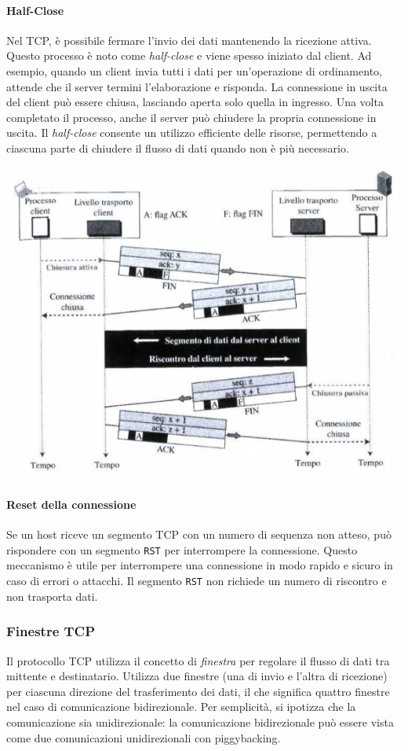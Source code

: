 \documentclass[12pt]{report}
\begin{document}
	\paragraph{Half-Close}
	Nel TCP, è possibile fermare l'invio dei dati mantenendo la ricezione attiva. Questo processo è noto come \textit{half-close} e viene spesso iniziato dal client. Ad esempio, quando un client invia tutti i dati per un'operazione di ordinamento, attende che il server termini l'elaborazione e risponda. La connessione in uscita del client può essere chiusa, lasciando aperta solo quella in ingresso. Una volta completato il processo, anche il server può chiudere la propria connessione in uscita.
	Il \textit{half-close} consente un utilizzo efficiente delle risorse, permettendo a ciascuna parte di chiudere il flusso di dati quando non è più necessario.
	\begin{center}
		\includegraphics[scale=0.6]{assets/halfclose.png}
	\end{center}

	\paragraph{Reset della connessione}
	Se un host riceve un segmento TCP con un numero di sequenza non atteso, può rispondere con un segmento \texttt{RST} per interrompere la connessione. Questo meccanismo è utile per interrompere una connessione in modo rapido e sicuro in caso di errori o attacchi. Il segmento \texttt{RST} non richiede un numero di riscontro e non trasporta dati.

	\subsubsection{Finestre TCP}
	Il protocollo TCP utilizza il concetto di \textit{finestra} per regolare il flusso di dati tra mittente e destinatario. Utilizza due finestre (una di invio e l'altra di ricezione) per ciascuna direzione del trasferimento dei dati, il che significa quattro finestre nel caso di comunicazione bidirezionale. Per semplicità, si ipotizza che la comunicazione sia unidirezionale: la comunicazione bidirezionale può essere vista come due comunicazioni unidirezionali con piggybacking.
\end{document}
